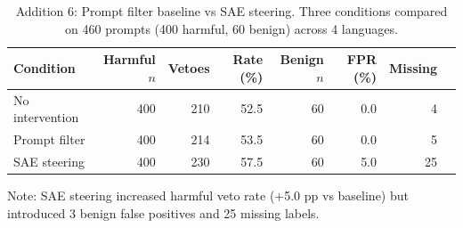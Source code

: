 \begin{table}[t]
\centering
\caption{Addition 6: Prompt filter baseline vs SAE steering. Three conditions compared on 460 prompts (400 harmful, 60 benign) across 4 languages.}
\label{tab:addition6_baseline}
\begin{tabular}{lrrrrrrr}
\toprule
Condition & Harmful $n$ & Vetoes & Rate (\%) & Benign $n$ & FPR (\%) & Missing \\
\midrule
No intervention & 400 & 210 & 52.5 & 60 & 0.0 & 4 \\
Prompt filter & 400 & 214 & 53.5 & 60 & 0.0 & 5 \\
SAE steering & 400 & 230 & 57.5 & 60 & 5.0 & 25 \\
\bottomrule
\end{tabular}
\begin{tablenotes}
\small
\item Note: SAE steering increased harmful veto rate (+5.0 pp vs baseline) but introduced 3 benign false positives and 25 missing labels.
\end{tablenotes}
\end{table}